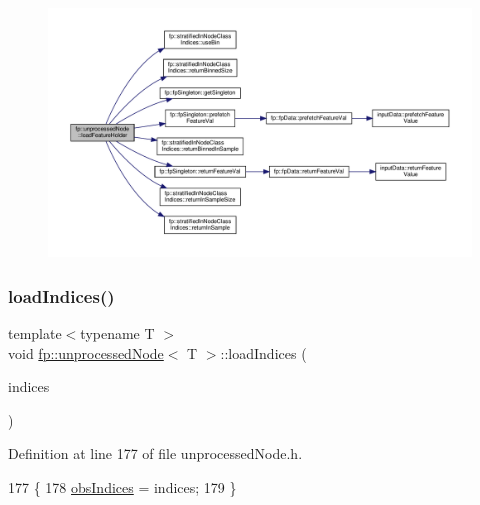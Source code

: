 \begin{figure}[H]
\begin{center}
\leavevmode
\includegraphics[width=350pt]{classfp_1_1unprocessedNode_a8cedeb8c4c88345ff97f9afb89b3ccd0_cgraph}
\end{center}
\end{figure}
\mbox{\label{classfp_1_1unprocessedNode_af5580595b612e9b3f5ddc4f28c43775c}} 
\subsubsection{\texorpdfstring{load\+Indices()}{loadIndices()}}
{\footnotesize\ttfamily template$<$typename T $>$ \\
void \hyperlink{classfp_1_1unprocessedNode}{fp\+::unprocessed\+Node}$<$ T $>$\+::load\+Indices (\begin{DoxyParamCaption}\item[{\hyperlink{classfp_1_1stratifiedInNodeClassIndices}{stratified\+In\+Node\+Class\+Indices} $\ast$}]{indices }\end{DoxyParamCaption})\hspace{0.3cm}{\ttfamily [inline]}}



Definition at line 177 of file unprocessed\+Node.\+h.


\begin{DoxyCode}
177                                                                               \{
178                     \hyperlink{classfp_1_1unprocessedNode_aea171244695a3a099061188a9553e525}{obsIndices} = indices;
179                 \}
\end{DoxyCode}
\mbox{\label{classfp_1_1unprocessedNode_a7b286c437f8f73fb3431358c11898a82}} 

